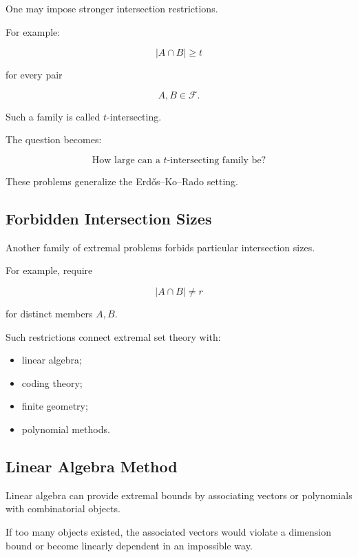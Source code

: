 One may impose stronger intersection restrictions.

For example:

\[
|A\cap B|\geq t
\]

for every pair

\[
A,B\in\mathcal{F}.
\]

Such a family is called \(t\)-intersecting.

The question becomes:

\[
\boxed{
\text{How large can a }t\text{-intersecting family be?}
}
\]

These problems generalize the Erd\H{o}s--Ko--Rado setting.

\subsection{Forbidden Intersection Sizes}
\label{subsec:forbidden-intersection-sizes}

Another family of extremal problems forbids particular intersection
sizes.

For example, require

\[
|A\cap B|\neq r
\]

for distinct members \(A,B\).

Such restrictions connect extremal set theory with:

\begin{itemize}
    \item linear algebra;
    \item coding theory;
    \item finite geometry;
    \item polynomial methods.
\end{itemize}

\subsection{Linear Algebra Method}
\label{subsec:linear-algebra-method-extremal}

Linear algebra can provide extremal bounds by associating vectors or
polynomials with combinatorial objects.

If too many objects existed, the associated vectors would violate a
dimension bound or become linearly dependent in an impossible way.

